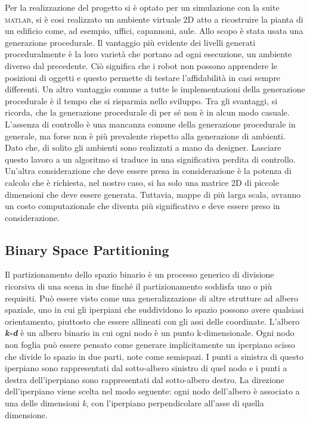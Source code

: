 Per la realizzazione del progetto si è optato per un simulazione con la suite
\textsc{matlab}, si è cosi realizzato un ambiente virtuale 2D atto a ricostruire 
la pianta di un edificio come, ad esempio, uffici, capannoni, aule. Allo scopo 
è stata usata una generazione procedurale.
Il vantaggio più evidente dei livelli generati proceduralmente è la loro varietà 
che portano ad ogni esecuzione, un ambiente diverso dal precedente. 
Ciò significa che i robot non possono apprendere le posizioni di oggetti e 
questo permette di testare l'affidabilità in casi sempre differenti.
Un altro vantaggio comune a tutte le implementazioni della generazione 
procedurale è il tempo che si risparmia nello sviluppo. 
Tra gli svantaggi, si ricorda, che la generazione procedurale di per sé non è 
in alcun modo casuale. 
L'assenza di controllo è una mancanza comune della generazione procedurale in 
generale, ma forse non è più prevalente rispetto alla generazione di ambienti.
Dato che, di solito gli ambienti sono realizzati a mano da designer. 
Lasciare questo lavoro a un algoritmo si traduce in una significativa perdita di 
controllo.
Un'altra considerazione che deve essere presa in considerazione è la potenza di 
calcolo che è richiesta, nel nostro caso, si ha solo una matrice 2D di piccole 
dimensioni che deve essere generata. Tuttavia, mappe di più larga scala, avranno
un costo computazionale che diventa più significativo e deve essere preso in 
considerazione.\cite{green2016procedural}

\subsection{Binary Space Partitioning}
Il partizionamento dello spazio binario è un processo generico di divisione 
ricorsiva di una scena in due finché il partizionamento soddisfa uno o più requisiti.
Può essere visto come una generalizzazione di altre strutture ad albero spaziale, 
uno in cui gli iperpiani che suddividono lo spazio possono avere qualsiasi 
orientamento, piuttosto che essere allineati con gli assi delle coordinate.\cite{wiki:bsp}
L'albero \textbf{\emph{k-d}} è un albero binario in cui ogni nodo è un punto 
k-dimensionale. Ogni nodo non foglia può essere pensato come generare 
implicitamente un iperpiano scisso che divide lo spazio in due parti, note come
semispazi. I punti a sinistra di questo iperpiano sono rappresentati dal 
sotto-albero sinistro di quel nodo e i punti a destra dell'iperpiano sono 
rappresentati dal sotto-albero destro. La direzione dell'iperpiano viene scelta 
nel modo seguente: ogni nodo dell'albero è associato a una delle dimensioni \emph{k}, 
con l'iperpiano perpendicolare all'asse di quella dimensione.\cite{wiki:kdtree}

